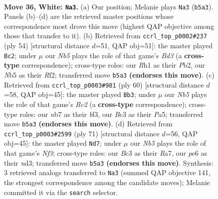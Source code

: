 \documentclass[11pt]{article}
\begin{document}
\clearpage

\begin{figure}[p]\centering
\begin{subfigure}{0.46\textwidth}\centering
\resizebox{\linewidth}{!}{%
\newchessgame
\chessboard[
  setfen={1rr5/pn3p1k/1p2p1pp/1N6/2P5/2B1P2P/PR3PP1/5K1R w - - 1 36},
  showmover=false,
  pgfstyle=straightmove, color=movearrow, markmove={b5-a3}
]}
\caption{}
\end{subfigure}\hfill
\begin{subfigure}{0.46\textwidth}\centering
\resizebox{\linewidth}{!}{%
\newchessgame
\chessboard[
  setfen={3rr1k1/1p3ppn/p1p4p/8/3PP1b1/P1NB4/1P1R1RPP/6K1 w - - 1 28},
  showmover=false,
  pgfstyle=straightmove, color=movearrow, markmove={d3-c2}
]}
\caption{}
\end{subfigure}
\\[4pt]
\begin{subfigure}{0.46\textwidth}\centering
\resizebox{\linewidth}{!}{%
\newchessgame
\chessboard[
  setfen={2r2r2/pp3kp1/4p2p/P4p2/1P6/2P2bP1/2B2P1P/2R1R1K1 w - - 4 31},
  showmover=false,
  pgfstyle=straightmove, color=movearrow, markmove={c2-b3}
]}
\caption{}
\end{subfigure}\hfill
\begin{subfigure}{0.46\textwidth}\centering
\resizebox{\linewidth}{!}{%
\newchessgame
\chessboard[
  setfen={r7/r4pk1/2R1pn1p/p5p1/P3P3/2RNK2P/1P4P1/8 b - - 1 36},
  showmover=false,
  pgfstyle=straightmove, color=movearrow, markmove={f6-d7}
]}
\caption{}
\end{subfigure}
\caption{\textbf{Move 36, White: \texttt{Na3}.} (a) Our position; Melanie plays \texttt{Na3} (\texttt{b5a3}). Panels (b)--(d) are the retrieved master positions whose correspondence most drove this move (highest QAP objective among those that transfer to it). (b) Retrieved from \texttt{ccrl\_top\_p0002\#237} (ply 54) [structural distance $d$=51, QAP obj=51]: the master played \texttt{Bc2}; under $\mu$ our \emph{Nb5} plays the role of that game's \emph{Bd3} (a \textbf{cross-type} correspondence); cross-type roles: our \emph{R}h1 as their \emph{P}b2, our \emph{N}b5 as their \emph{R}f2; transferred move \texttt{b5a3} \textbf{(endorses this move)}. (c) Retrieved from \texttt{ccrl\_top\_p0003\#981} (ply 60) [structural distance $d$=58, QAP obj=45]: the master played \texttt{Bb3}; under $\mu$ our \emph{Nb5} plays the role of that game's \emph{Bc2} (a \textbf{cross-type} correspondence); cross-type roles: our \emph{n}b7 as their \emph{b}f3, our \emph{B}c3 as their \emph{P}a5; transferred move \texttt{b5a3} \textbf{(endorses this move)}. (d) Retrieved from \texttt{ccrl\_top\_p0003\#2599} (ply 71) [structural distance $d$=56, QAP obj=45]: the master played \texttt{Nd7}; under $\mu$ our \emph{Nb5} plays the role of that game's \emph{Nf3}; cross-type roles: our \emph{B}c3 as their \emph{R}a7, our \emph{p}e6 as their \emph{n}d3; transferred move \texttt{b5a3} \textbf{(endorses this move)}. Synthesis: 3 retrieved analogs transferred to \texttt{Na3} (summed QAP objective 141, the strongest correspondence among the candidate moves); Melanie committed it via the \texttt{search} selector.}
\label{fig:thought-m70}
\end{figure}
\end{document}
